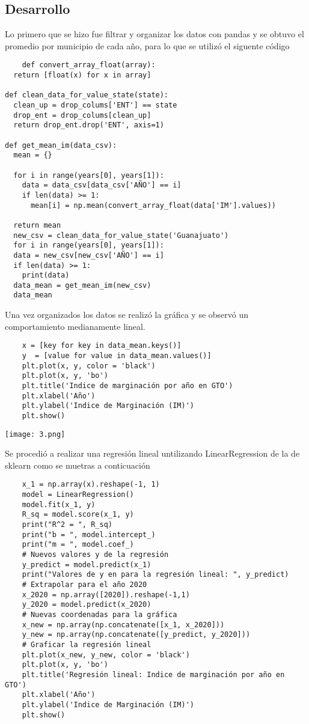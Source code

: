 \documentclass[12pt]{article}
\begin{document}
\subsection{Desarrollo}
Lo primero que se hizo fue filtrar y organizar los datos con pandas y se obtuvo el promedio por municipio de cada año, para lo que se utilizó el siguente código
\begin{verbatim}
    def convert_array_float(array):
  return [float(x) for x in array]

def clean_data_for_value_state(state):
  clean_up = drop_colums['ENT'] == state
  drop_ent = drop_colums[clean_up]
  return drop_ent.drop('ENT', axis=1)

def get_mean_im(data_csv):
  mean = {}
  
  for i in range(years[0], years[1]):
    data = data_csv[data_csv['AÑO'] == i]
    if len(data) >= 1:
      mean[i] = np.mean(convert_array_float(data['IM'].values))

  return mean
  new_csv = clean_data_for_value_state('Guanajuato')
  for i in range(years[0], years[1]):
  data = new_csv[new_csv['AÑO'] == i]
  if len(data) >= 1:
    print(data)
  data_mean = get_mean_im(new_csv)
  data_mean    
\end{verbatim}
Una vez organizados los datos se realizó la gráfica y se observó un comportamiento medianamente lineal.
\begin{verbatim}
    x = [key for key in data_mean.keys()]
    y  = [value for value in data_mean.values()] 
    plt.plot(x, y, color = 'black')
    plt.plot(x, y, 'bo')
    plt.title('Indice de marginación por año en GTO')
    plt.xlabel('Año')
    plt.ylabel('Indice de Marginación (IM)')
    plt.show()
\end{verbatim}
\texttt{[image: 3.png]}\par
Se procedió a realizar una regresión lineal untilizando LinearRegression de la de sklearn como se muetras a conticuación
\begin{verbatim}
    x_1 = np.array(x).reshape(-1, 1)
    model = LinearRegression()
    model.fit(x_1, y)
    R_sq = model.score(x_1, y)
    print("R^2 = ", R_sq)
    print("b = ", model.intercept_)
    print("m = ", model.coef_)
    # Nuevos valores y de la regresión
    y_predict = model.predict(x_1)
    print("Valores de y en para la regresión lineal: ", y_predict)
    # Extrapolar para el año 2020
    x_2020 = np.array([2020]).reshape(-1,1)
    y_2020 = model.predict(x_2020)
    # Nuevas coordenadas para la gráfica
    x_new = np.array(np.concatenate([x_1, x_2020]))
    y_new = np.array(np.concatenate([y_predict, y_2020]))
    # Graficar la regresión lineal
    plt.plot(x_new, y_new, color = 'black')
    plt.plot(x, y, 'bo')
    plt.title('Regresión lineal: Indice de marginación por año en GTO')
    plt.xlabel('Año')
    plt.ylabel('Indice de Marginación (IM)')
    plt.show()
\end{verbatim}
\end{document}
